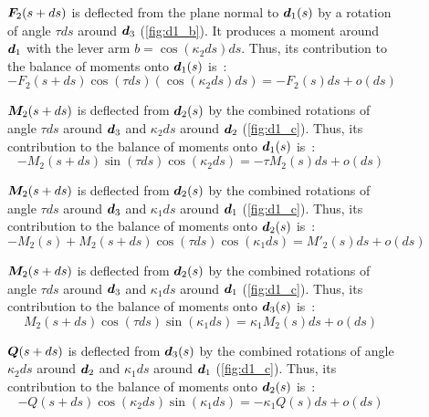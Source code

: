 \begin{figure}[p]
\begin{fullpage}
	$\boldsymbol{F}_2(s+ds)$ is deflected from the plane normal to $\boldsymbol{d}_1(s)$ by a rotation of angle $\tau ds$ around $\boldsymbol{d}_3$ (\cref{fig:d1_b}). It produces a moment around $\boldsymbol{d}_1$ with the lever arm $b =  \cos(\kappa_2 ds) ds$. Thus, its contribution to the balance of moments onto $\boldsymbol{d}_1(s)$ is~: 
	\begin{equation*}
		-F_2(s+ds) \cos(\tau ds) (\cos(\kappa_2 ds) ds) = -F_2(s) ds + o(ds)
	\end{equation*}
	
	$\boldsymbol{M}_2(s+ds)$ is deflected from $\boldsymbol{d}_2(s)$ by the combined rotations of angle $\tau ds$ around $\boldsymbol{d}_3$ and $\kappa_2 ds$ around $\boldsymbol{d}_2$ (\cref{fig:d1_c}). Thus, its contribution to the balance of moments onto $\boldsymbol{d}_1(s)$ is~: 
	\begin{equation*}
		-M_2(s+ds) \sin(\tau ds) \cos(\kappa_2 ds) = -\tau M_2 (s) ds + o(ds)
	\end{equation*}	
	
	$\boldsymbol{M}_2(s+ds)$ is deflected from $\boldsymbol{d}_2(s)$ by the combined rotations of angle $\tau ds$ around $\boldsymbol{d}_3$ and $\kappa_1 ds$ around $\boldsymbol{d}_1$ (\cref{fig:d1_c}). Thus, its contribution to the balance of moments onto $\boldsymbol{d}_2(s)$ is~: 
	\begin{equation*}
		-M_2(s) + M_2(s+ds) \cos(\tau ds) \cos(\kappa_1 ds) = M'_2 (s) ds + o(ds)
	\end{equation*}
	
	$\boldsymbol{M}_2(s+ds)$ is deflected from $\boldsymbol{d}_2(s)$ by the combined rotations of angle $\tau ds$ around $\boldsymbol{d}_3$ and $\kappa_1 ds$ around $\boldsymbol{d}_1$ (\cref{fig:d1_c}). Thus, its contribution to the balance of moments onto $\boldsymbol{d}_3(s)$ is~: 
	\begin{equation*}
		M_2(s+ds) \cos(\tau ds) \sin(\kappa_1 ds) = \kappa_1 M_2 (s) ds + o(ds)
	\end{equation*}	
	
	$\boldsymbol{Q}(s+ds)$ is deflected from $\boldsymbol{d}_3(s)$ by the combined rotations of angle $\kappa_2 ds$ around $\boldsymbol{d}_2$ and $\kappa_1 ds$ around $\boldsymbol{d}_1$ (\cref{fig:d1_c}). Thus, its contribution to the balance of moments onto $\boldsymbol{d}_2(s)$ is~: 
	\begin{equation*}
		-Q(s+ds) \cos(\kappa_2 ds) \sin(\kappa_1 ds) = -\kappa_1 Q(s) ds + o(ds)
	\end{equation*}	
	  \end{fullpage}
\end{figure}

 
